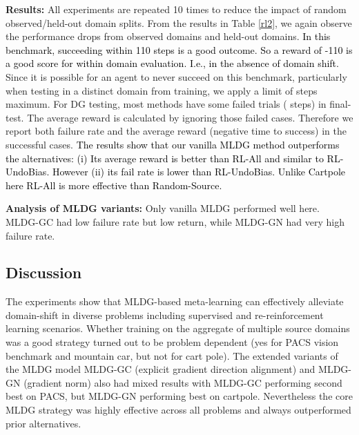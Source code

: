 \documentclass[letterpaper]{article} \usepackage{aaai18}  \usepackage{times}  \usepackage{helvet}  \usepackage{courier}  \usepackage{url}  \usepackage{graphicx}  \usepackage{amsmath}
\newcommand{\keypoint}[1]{\vspace{0.1cm}\noindent\textbf{#1}\quad}
\begin{document}
{\keypoint{Results:} All experiments are repeated 10 times to reduce the impact of random observed/held-out domain splits. From the results in Table \ref{rl2}, we again observe the performance drops from observed domains and held-out domains.
\textcolor{black}{In this benchmark, succeeding within 110 steps is a good outcome. So a reward of -110 is a good score for within domain evaluation. I.e., in the absence of domain shift.} Since it is possible for an agent to never succeed on this benchmark, particularly when testing in a distinct domain from training, we apply a limit of  steps maximum. 
For DG testing, most methods have some failed trials ( steps) in final-test. 
The average reward is calculated by ignoring those failed cases. Therefore we report both failure rate and the average reward (negative time to success) in the successful cases. 
\textcolor{black}{The results show that our vanilla MLDG method outperforms the alternatives: (i) Its average reward is better than RL-All and similar to RL-UndoBias. However (ii) its fail rate is lower than RL-UndoBias. Unlike Cartpole here RL-All is more effective than Random-Source.}

\keypoint{Analysis of MLDG variants:} Only vanilla MLDG performed well here. MLDG-GC had low failure rate but low return, while MLDG-GN had very high failure rate. 

\subsection{Discussion}
The experiments show that MLDG-based meta-learning can effectively alleviate domain-shift in diverse problems including supervised and re-reinforcement learning scenarios. Whether training on the aggregate of multiple source domains was a good strategy turned out to be problem dependent (yes for PACS vision benchmark and mountain car, but not for cart pole). The extended variants of the MLDG model MLDG-GC (explicit gradient direction alignment) and MLDG-GN (gradient norm) also had mixed results with MLDG-GC performing second best on PACS, but MLDG-GN performing best on cartpole. Nevertheless the core MLDG strategy was highly effective across all problems and always outperformed prior alternatives. 

}
\end{document}
